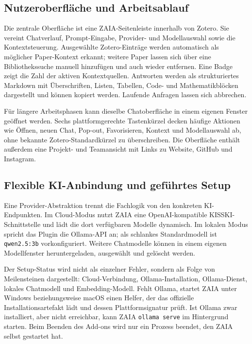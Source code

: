 \documentclass[11pt,a4paper,oneside,parskip=half]{scrartcl}
\begin{document}
\subsection{Nutzeroberfläche und Arbeitsablauf}

Die zentrale Oberfläche ist eine ZAIA-Seitenleiste innerhalb von Zotero. Sie
vereint Chatverlauf, Prompt-Eingabe, Provider- und Modellauswahl sowie die
Kontextsteuerung. Ausgewählte Zotero-Einträge werden automatisch als möglicher
Paper-Kontext erkannt; weitere Paper lassen sich über eine Bibliothekssuche
manuell hinzufügen und auch wieder entfernen. Eine Badge zeigt die Zahl der
aktiven Kontextquellen. Antworten werden als strukturiertes Markdown mit
Überschriften, Listen, Tabellen, Code- und Mathematikblöcken dargestellt und
können kopiert werden. Laufende Anfragen lassen sich abbrechen.

Für längere Arbeitsphasen kann dieselbe Chatoberfläche in einem eigenen Fenster
geöffnet werden. Sechs plattformgerechte Tastenkürzel decken häufige Aktionen
wie Öffnen, neuen Chat, Pop-out, Favorisieren, Kontext und Modellauswahl ab, ohne
bekannte Zotero-Standardkürzel zu überschreiben. Die Oberfläche enthält außerdem
eine Projekt- und Teamansicht mit Links zu Website, GitHub und Instagram.

\subsection{Flexible KI-Anbindung und geführtes Setup}

Eine Provider-Abstraktion trennt die Fachlogik von den konkreten KI-Endpunkten.
Im Cloud-Modus nutzt ZAIA eine OpenAI-kompatible KISSKI-Schnittstelle und lädt
die dort verfügbaren Modelle dynamisch. Im lokalen Modus spricht das Plugin die
Ollama-API an; als schlankes Standardmodell ist \texttt{qwen2.5:3b}
vorkonfiguriert. Weitere Chatmodelle können in einem eigenen Modellfenster
heruntergeladen, ausgewählt und gelöscht werden.

Der Setup-Status wird nicht als einzelner Fehler, sondern als Folge von
Meilensteinen dargestellt: Cloud-Verbindung, Ollama-Installation,
Ollama-Dienst, lokales Chatmodell und Embedding-Modell. Fehlt Ollama, startet
ZAIA unter Windows beziehungsweise macOS einen Helfer, der das offizielle
Installationsartefakt lädt und dessen Plattformsignatur prüft. Ist Ollama zwar
installiert, aber nicht erreichbar, kann ZAIA \texttt{ollama serve} im
Hintergrund starten. Beim Beenden des Add-ons wird nur ein Prozess beendet, den
ZAIA selbst gestartet hat.
\end{document}
